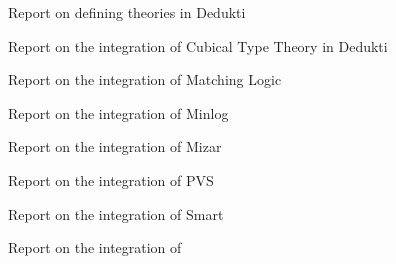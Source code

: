 \begin{workpackage}
\begin{tasklist}
\end{tasklist}

\begin{wpdelivs}
  \begin{wpdeliv}[due=18,id=wp2midterm,dissem=PU,nature=R,lead=Inn]{Report on defining theories in Dedukti}\end{wpdeliv}

  \begin{wpdeliv}[due=48,id=wp2cubical,dissem=PU,nature=R,lead=Inr,task=hott]{Report on the integration of Cubical Type Theory in Dedukti}\end{wpdeliv}

  \begin{wpdeliv}[due=36,id=wp2matching,dissem=PU,nature=R,lead=Ias,task=matching]{\hspace{-2mm}Report on the integration of Matching Logic}\end{wpdeliv}

  \begin{wpdeliv}[due=48,id=wp2minlog,dissem=PU,nature=R,lead=Lmu,task=minlog]{Report on the integration of Minlog}\end{wpdeliv}

  \begin{wpdeliv}[due=48,id=wp2mizar,dissem=PU,nature=R,lead=Bia,task=mizar]{Report on the integration of Mizar}\end{wpdeliv}

  \begin{wpdeliv}[due=48,id=wp2pvs,dissem=PU,nature=R,lead=Inr,task=pvs]{Report on the integration of PVS}\end{wpdeliv}
  
  \begin{wpdeliv}[due=48,id=wp2smart,dissem=PU,nature=R,lead=Pro,task=smart]{Report on the integration of Smart}\end{wpdeliv}
  
  \begin{wpdeliv}[due=48,id=wp2tlaplus,dissem=PU,nature=R,lead=Inr,task=tla]{Report on the integration of \tlaplus}\end{wpdeliv}
\end{wpdelivs}
\end{workpackage}


